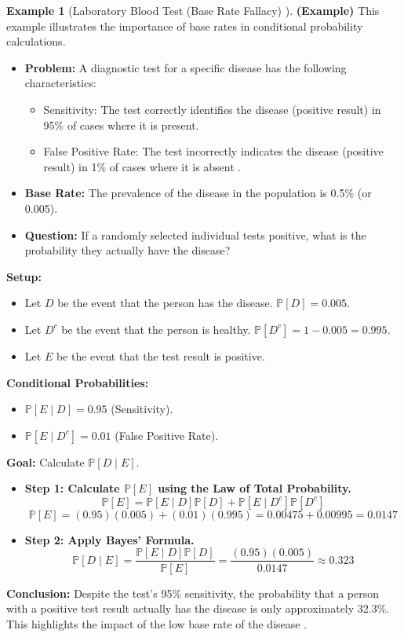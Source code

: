 \documentclass[12pt, a4paper]{article}
\theoremstyle{definition}
\newtheorem{example}{Example}[section] %
\theoremstyle{plain}
\newcommand{\Prob}[1]{\mathbb{P}\left[#1\right]} %
\newcommand{\condProb}[2]{\mathbb{P}\left[#1 \mid #2\right]} %
\newcommand{\comp}[1]{#1^c} %
\begin{document}
\begin{example}[Laboratory Blood Test (Base Rate Fallacy) \cite{Ross}]
\textbf{(Example)} This example illustrates the importance of base rates in conditional probability calculations.
\begin{itemize}
    \item \textbf{Problem:} A diagnostic test for a specific disease has the following characteristics:
        \begin{itemize}
            \item Sensitivity: The test correctly identifies the disease (positive result) in 95\% of cases where it is present.
            \item False Positive Rate: The test incorrectly indicates the disease (positive result) in 1\% of cases where it is absent \cite{Ross}.
        \end{itemize}
    \item \textbf{Base Rate:} The prevalence of the disease in the population is 0.5\% (or 0.005).
    \item \textbf{Question:} If a randomly selected individual tests positive, what is the probability they actually have the disease?
\end{itemize}
\textbf{Setup:}
\begin{itemize}
    \item Let $D$ be the event that the person has the disease. $\Prob{D} = 0.005$.
    \item Let $\comp{D}$ be the event that the person is healthy. $\Prob{\comp{D}} = 1 - 0.005 = 0.995$.
    \item Let $E$ be the event that the test result is positive.
\end{itemize}
\textbf{Conditional Probabilities:}
\begin{itemize}
    \item $\condProb{E}{D} = 0.95$ (Sensitivity).
    \item $\condProb{E}{\comp{D}} = 0.01$ (False Positive Rate).
\end{itemize}
\textbf{Goal:} Calculate $\condProb{D}{E}$.
\begin{itemize}
    \item \textbf{Step 1: Calculate $\Prob{E}$ using the Law of Total Probability.}
        \[ \Prob{E} = \condProb{E}{D}\Prob{D} + \condProb{E}{\comp{D}}\Prob{\comp{D}} \]
        \[ \Prob{E} = (0.95)(0.005) + (0.01)(0.995) = 0.00475 + 0.00995 = 0.0147 \]
    \item \textbf{Step 2: Apply Bayes' Formula.}
        \[ \condProb{D}{E} = \frac{\condProb{E}{D}\Prob{D}}{\Prob{E}} = \frac{(0.95)(0.005)}{0.0147} \approx 0.323 \]
\end{itemize}
\textbf{Conclusion:} Despite the test's 95\% sensitivity, the probability that a person with a positive test result actually has the disease is only approximately 32.3\%. This highlights the impact of the low base rate of the disease \cite{Ross}.
\end{example}
\end{document}

